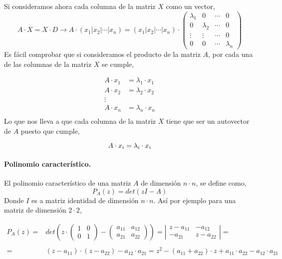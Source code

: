 Si consideramos ahora cada columna de la matriz $X$ como un vector,
\begin{equation*}
A\cdot X= X\cdot D \rightarrow A\cdot \left( x_1 | x_2 | \cdots | x_n \right)= \left( x_1 | x_2 | \cdots | x_n \right) \cdot\begin{pmatrix}
\lambda_1& 0 & \cdots & 0\\
0& \lambda_2& \cdots & 0\\
\vdots & \vdots& \cdots & 0\\
0& 0& \cdots & \lambda_n
\end{pmatrix}
\end{equation*}
Es fácil comprobar que si consideramos el producto de la matriz $A$, por cada una de las columnas de la matriz $X$ se cumple,

\begin{align*}
A\cdot x_1 &=\lambda_1 \cdot x_1 \\
A\cdot x_2 &=\lambda_2 \cdot x_2 \\
\vdots \\
A\cdot x_n &=\lambda_n \cdot x_n \\
\end{align*}
Lo que nos lleva a que cada columna de la matriz $X$ tiene que ser un autovector de $A$ puesto que cumple,

\begin{equation*}
A\cdot x_i =\lambda_i \cdot x_i \\
\end{equation*}

\paragraph{Polinomio característico.} El polinomio característico de una matriz $A$ de dimensión $n\cdot n$, se define como,
\begin{equation*}
P_A(z)=det(zI-A)
\end{equation*}
Donde $I$ es a matriz identidad de dimensión $n \cdot n$. Así por ejemplo para una matriz de dimensión $2\cdot 2$,

\begin{align*}
P_A(z)=&det\left(z\cdot \begin{pmatrix}
1& 0\\
0& 1
\end{pmatrix}- \begin{pmatrix}
a_{11}& a_{12}\\
a_{21}& a_{22}
\end{pmatrix} \right)=\left\vert \begin{matrix}
z-a_{11}& -a_{12}\\
-a_{21}& z-a_{22}
\end{matrix} \right\vert=\\
\\
=&(z-a_{11})\cdot(z-a_{22})-a_{12}\cdot a_{21}=z^2-(a_{11}+a_{22})\cdot z+a_{11}\cdot a_{22}-a_{12}\cdot a_{21}
\end{align*}


